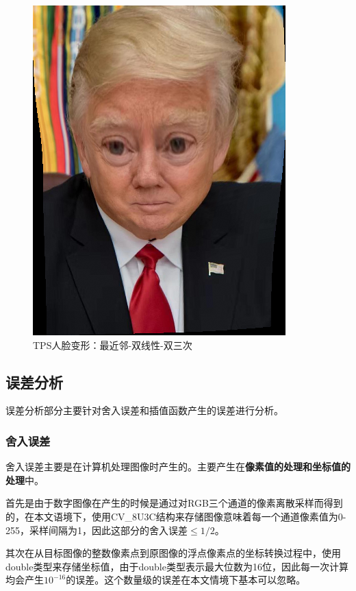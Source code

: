 \documentclass[UTF8]{ctexart}
\begin{document}
\begin{figure}[H]
    \includegraphics[scale=0.28]{../images/report-images/8to6bicub.png}
    \caption{TPS人脸变形：最近邻-双线性-双三次}
\end{figure}


\subsection{误差分析}
误差分析部分主要针对舍入误差和插值函数产生的误差进行分析。
\subsubsection{舍入误差}
舍入误差主要是在计算机处理图像时产生的。主要产生在\textbf{像素值的处理和坐标值的处理}中。

首先是由于数字图像在产生的时候是通过对RGB三个通道的像素离散采样而得到的，在本文语境下，使用CV\_8U3C结构来存储图像意味着每一个通道像素值为0-255，采样间隔为1，因此这部分的舍入误差$\leq 1/2$。

其次在从目标图像的整数像素点到原图像的浮点像素点的坐标转换过程中，使用double类型来存储坐标值，由于double类型表示最大位数为16位，因此每一次计算均会产生$10^{-16}$的误差。这个数量级的误差在本文情境下基本可以忽略。
\end{document}
